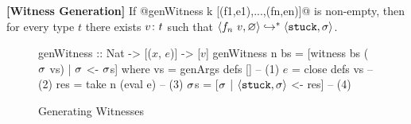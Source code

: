 \begin{cor}{\textbf{[Witness Generation]}}
\label{thm:generation}
  If @genWitness k [(f1,e1),...,(fn,en)]@ is non-empty,
  then for every type $t$ there exists ${v} \colon {t}$ such that
  $\langle f_n \ v, \varnothing \rangle \hookrightarrow^{*} \langle \mathtt{stuck}, \sigma \rangle$.
\end{cor}

\begin{figure}[t]
\centering
\begin{mcode}
genWitness :: Nat -> [($x$, $e$)] -> [$v$]
genWitness n bs
       = [witness bs ($\sigma$ vs) | $\sigma$ <- $\sigma$s]
  where
   vs  = genArgs defs []      -- (1)
   $e$    = close defs vs        -- (2)
   res = take n (eval e)      -- (3)
   $\sigma$s   = [$\sigma$ | $\langle \mathtt{stuck}, \sigma \rangle$ <- res]  -- (4)
\end{mcode}
\caption{Generating Witnesses}
\label{fig:algo-gen-witness}
\end{figure}


